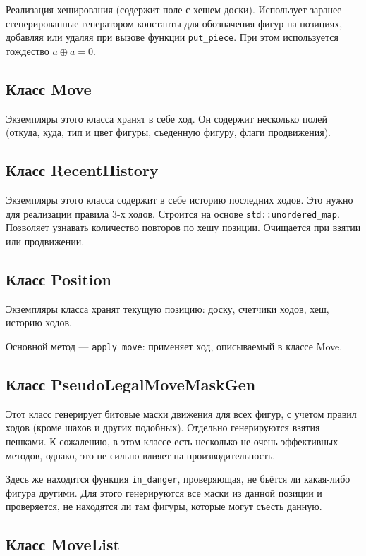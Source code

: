 Реализация хеширования (содержит поле с хешем доски). Использует заранее сгенерированные генератором константы для обозначения фигур на позициях, добавляя или удаляя при вызове функции \texttt{put\_piece}. При этом используется тождество $a\oplus a = 0$.

\subsection*{Класс Move}

Экземпляры этого класса хранят в себе ход. Он содержит несколько полей (откуда, куда, тип и цвет фигуры, съеденную фигуру, флаги продвижения). 

\subsection*{Класс RecentHistory}

Экземпляры этого класса содержит в себе историю последних ходов. Это нужно для реализации правила 3-х ходов. Строится на основе \texttt{std::unordered\_map}. Позволяет узнавать количество повторов по хешу позиции. Очищается при взятии или продвижении.

\subsection*{Класс Position}

Экземпляры класса хранят текущую позицию: доску, счетчики ходов, хеш, историю ходов. 

Основной метод --- \texttt{apply\_move}: применяет ход, описываемый в классе Move.

\subsection*{Класс PseudoLegalMoveMaskGen}

Этот класс генерирует битовые маски движения для всех фигур, с учетом правил ходов (кроме шахов и других подобных). Отдельно генерируются взятия пешками. К сожалению, в этом классе есть несколько не очень эффективных методов, однако, это не сильно влияет на производительность.

Здесь же находится функция \texttt{in\_danger}, проверяющая, не бьётся ли какая-либо фигура другими. Для этого генерируются все маски из данной позиции и проверяется, не находятся ли там фигуры, которые могут съесть данную.

\subsection*{Класс MoveList}

